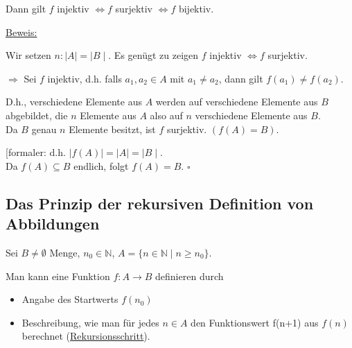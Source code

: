 \documentclass[a4paper, 12pt, twoside] {article}
\begin{document}
Dann gilt $f$ injektiv $\Leftrightarrow f$ surjektiv $\Leftrightarrow f$ bijektiv.

\underline{Beweis:}

Wir setzen $n: \mid A \mid = \mid B \mid$. Es genügt zu zeigen $f$ injektiv $\Leftrightarrow f$ surjektiv.

$\Rightarrow$ Sei $f$ injektiv, d.h. falls $a_1, a_2 \in A$ mit $a_1 \neq a_2$, dann gilt $f(a_1) \neq f(a_2)$.

D.h., verschiedene Elemente aus $A$ werden auf verschiedene Elemente aus $B$ abgebildet, die $n$ Elemente aus $A$ also auf $n$ verschiedene Elemente aus $B$. \\
Da $B$ genau $n$ Elemente besitzt, ist $f$ surjektiv. $(f(A) = B)$.

[formaler: d.h. $\mid f(A) \mid = \mid A \mid = \mid B \mid$. \\
Da $f(A) \subseteq B$ endlich, folgt $f(A) = B$. \hfill $\square$

\subsection{Das Prinzip der rekursiven Definition von Abbildungen}

Sei $B \neq \emptyset$ Menge, $n_0 \in \mathbb{N}$, \qquad $A = \{n \in \mathbb{N} \mid n \geq n_0\}$.

Man kann eine Funktion $f: A \rightarrow B$ definieren durch
\begin{itemize}
\item Angabe des Startwerts $f(n_0)$
\item Beschreibung, wie man für jedes $n \in A$ den Funktionswert f(n+1) aus $f(n)$ berechnet (\underline{Rekursionsschritt}).
\end{itemize}
\end{document}
